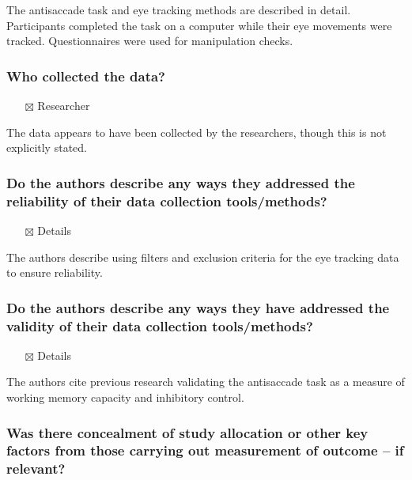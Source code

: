 \documentclass[
  doc, a4paper]{apa7}
\providecommand{\tightlist}{%
  \setlength{\itemsep}{0pt}\setlength{\parskip}{0pt}}
\begin{document}
The antisaccade task and eye tracking methods are described in detail. Participants completed the task on a computer while their eye movements were tracked. Questionnaires were used for manipulation checks.

\subsubsection{Who collected the data?}\label{who-collected-the-data}

\begin{itemize}
\tightlist
\item[$\boxtimes$]
  Researcher
\end{itemize}

The data appears to have been collected by the researchers, though this is not explicitly stated.

\subsubsection{Do the authors describe any ways they addressed the reliability of their data collection tools/methods?}\label{do-the-authors-describe-any-ways-they-addressed-the-reliability-of-their-data-collection-toolsmethods}

\begin{itemize}
\tightlist
\item[$\boxtimes$]
  Details
\end{itemize}

The authors describe using filters and exclusion criteria for the eye tracking data to ensure reliability.

\subsubsection{Do the authors describe any ways they have addressed the validity of their data collection tools/methods?}\label{do-the-authors-describe-any-ways-they-have-addressed-the-validity-of-their-data-collection-toolsmethods}

\begin{itemize}
\tightlist
\item[$\boxtimes$]
  Details
\end{itemize}

The authors cite previous research validating the antisaccade task as a measure of working memory capacity and inhibitory control.

\subsubsection{Was there concealment of study allocation or other key factors from those carrying out measurement of outcome -- if relevant?}\label{was-there-concealment-of-study-allocation-or-other-key-factors-from-those-carrying-out-measurement-of-outcome-if-relevant}
\end{document}
